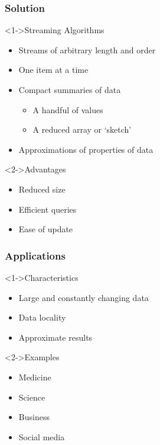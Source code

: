 \begin{frame}
  \frametitle{Solution}

  \begin{block}<1->{Streaming Algorithms}
    \begin{itemize}
      \item Streams of arbitrary length and order
      \item One item at a time
      \item Compact summaries of data
      \begin{itemize}
        \item A handful of values
        \item A reduced array or `sketch'
      \end{itemize}
      \item Approximations of properties of data
    \end{itemize}
  \end{block}

  \begin{block}<2->{Advantages}
    \begin{itemize}
      \item Reduced size
      \item Efficient queries
      \item Ease of update
    \end{itemize}
  \end{block}
\end{frame}

\begin{frame}
  \frametitle{Applications}

  \begin{block}<1->{Characteristics}
    \begin{itemize}
      \item Large and constantly changing data
      \item Data locality
      \item Approximate results
    \end{itemize}
  \end{block}

  \begin{block}<2->{Examples}
    \begin{itemize}
      \item Medicine
      \item Science
      \item Business
      \item Social media
    \end{itemize}
  \end{block}
\end{frame}

